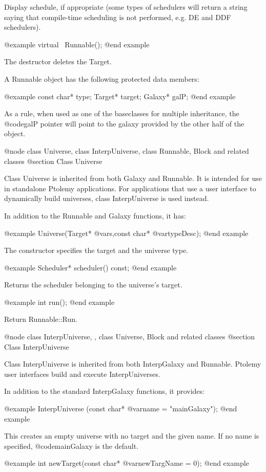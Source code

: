 Display schedule, if appropriate (some types of schedulers will return a
string saying that compile-time scheduling is not performed, e.g. DE
and DDF schedulers).

@example
virtual ~Runnable();
@end example

The destructor deletes the Target.

A Runnable object has the following protected data members:

@example
const char* type;
Target* target;
Galaxy* galP;
@end example

As a rule, when used as one of the baseclasses for multiple inheritance,
the @code{galP} pointer will point to the galaxy provided by the other
half of the object.

@node class Universe, class InterpUniverse, class Runnable, Block and related classes
@section Class Universe

Class Universe is inherited from both Galaxy and Runnable.  It is
intended for use in standalone Ptolemy applications.  For applications
that use a user interface to dynamically build universes, class
InterpUniverse is used instead.

In addition to the Runnable and Galaxy functions, it has:

@example
Universe(Target* @var{s},const char* @var{typeDesc});
@end example

The constructor specifies the target and the universe type.

@example
Scheduler* scheduler() const;
@end example

Returns the scheduler belonging to the universe's target.

@example
int run();
@end example

Return Runnable::Run.

@node class InterpUniverse,  , class Universe, Block and related classes
@section Class InterpUniverse

Class InterpUniverse is inherited from both InterpGalaxy and Runnable.
Ptolemy user interfaces build and execute InterpUniverses.

In addition to the standard InterpGalaxy functions, it provides:

@example
InterpUniverse (const char* @var{name} = "mainGalaxy");
@end example

This creates an empty universe with no target and the given name.
If no name is specified, @code{mainGalaxy} is the default.

@example
int newTarget(const char* @var{newTargName} = 0);
@end example

